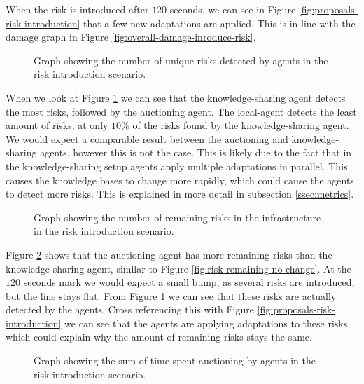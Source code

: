 When the risk is introduced after $120$ seconds, we can see in Figure \ref{fig:proposals-risk-introduction} that a few new adaptations are applied. This is in line with the damage graph in Figure \ref{fig:overall-damage-inroduce-risk}.

\begin{figure}[H]
    \centering
        
    \caption{Graph showing the number of unique risks detected by agents in the risk introduction scenario.}
    \label{fig:risk-count-risk-introduction}
\end{figure}

When we look at Figure \ref{fig:risk-count-risk-introduction} we can see that the knowledge-sharing agent detects the most risks, followed by the auctioning agent. The local-agent detects the least amount of risks, at only $10\%$ of the risks found by the knowledge-sharing agent. We would expect a comparable result between the auctioning and knowledge-sharing agents, however this is not the case. This is likely due to the fact that in the knowledge-sharing setup agents apply multiple adaptations in parallel. This causes the knowledge bases to change more rapidly, which could cause the agents to detect more risks. This is explained in more detail in subsection \ref{ssec:metrics}.

\begin{figure}[H]
    \centering
        
    \caption{Graph showing the number of remaining risks in the infrastructure in the risk introduction scenario.}
    \label{fig:risk-remaining-risk-introduction}
\end{figure}

Figure \ref{fig:risk-remaining-risk-introduction} shows that the auctioning agent has more remaining risks than the knowledge-sharing agent, similar to Figure \ref{fig:risk-remaining-no-change}. At the $120$ seconds mark we would expect a small bump, as several risks are introduced, but the line stays flat. From Figure \ref{fig:risk-count-risk-introduction} we can see that these risks are actually detected by the agents. Cross referencing this with Figure \ref{fig:proposals-risk-introduction} we can see that the agents are applying adaptations to these risks, which could explain why the amount of remaining risks stays the same.

\begin{figure}[H]
    \hspace*{-1.2cm}
    \centering
        
    \caption{Graph showing the sum of time spent auctioning by agents in the risk introduction scenario.}
    \label{fig:auctioning-time-risk-introduction}
\end{figure}

